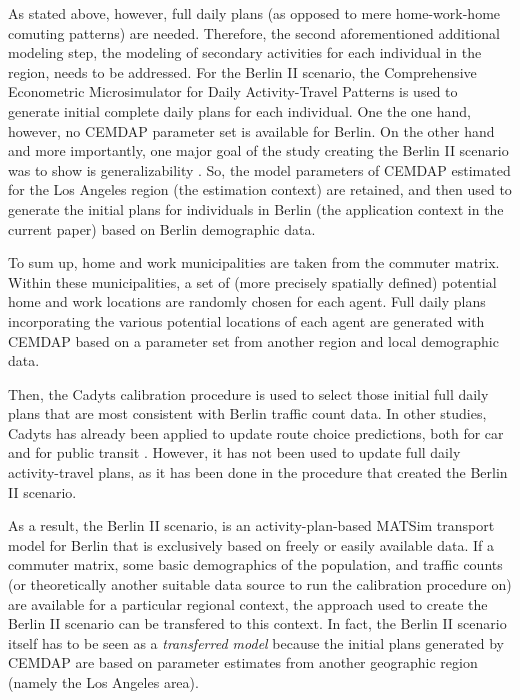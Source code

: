As stated above, however, full daily plans (as opposed to mere home-work-home comuting patterns) are needed. Therefore, the second aforementioned additional modeling step, the modeling of secondary activities for each individual in the region, needs to be addressed. For the Berlin II scenario, the Comprehensive Econometric Microsimulator for Daily Activity-Travel Patterns \citep{BhatEtAl2008CEMDAPUserManual} is used to generate initial complete daily plans for each individual. One the one hand, however, no CEMDAP parameter set is available for Berlin. On the other hand and more importantly, one major goal of the study creating the Berlin II scenario was to show is generalizability \citep{ ZiemkeNagelBhat2015IntegratingCemdapMatsimTransferabilityTRB}. So, the model parameters of CEMDAP estimated for the Los Angeles region (the estimation context) are retained, and then used to generate the initial plans for individuals in Berlin (the application context in the current paper) based on Berlin demographic data.

To sum up, home and work municipalities are taken from the commuter matrix. Within these municipalities, a set of (more precisely spatially defined) potential home and work locations are randomly chosen for each agent. Full daily plans incorporating the various potential locations of each agent are generated with CEMDAP based on a parameter set from another region and local demographic data.

Then, the Cadyts calibration procedure is used to select those initial full daily plans that are most consistent with Berlin traffic count data. In other studies, Cadyts has already been applied to update route choice predictions, both for car \citep{FloetteroedChenEtAl2011BehavioralCalibAndAna} and for public transit \citep{MoyoNagel2013ptNetCalibrationABMTPO}. However, it has not been used to update full daily activity-travel plans, as it has been done in the procedure that created the Berlin II scenario. 

As a result, the Berlin II scenario, is an activity-plan-based MATSim transport model for Berlin that is exclusively based on freely or easily available data. If a commuter matrix, some basic demographics of the population, and traffic counts (or theoretically another suitable data source to run the calibration procedure on) are available for a particular regional context, the approach used to create the Berlin II scenario can be transfered to this context. In fact, the Berlin II scenario itself has to be seen as a \textit{transferred model} because the initial plans generated by CEMDAP are based on parameter estimates from another geographic region (namely the Los Angeles area).


